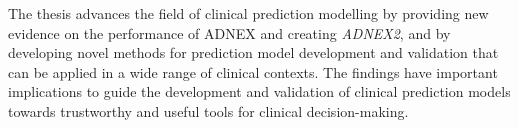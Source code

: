 The thesis advances the field of clinical prediction modelling by providing new evidence on the performance of \gls{ADNEX} and creating \emph{ADNEX2}, and by developing novel methods for prediction model development and validation that can be applied in a wide range of clinical contexts. The findings have important implications to guide the development and validation of clinical prediction models towards trustworthy and useful tools for clinical decision-making.